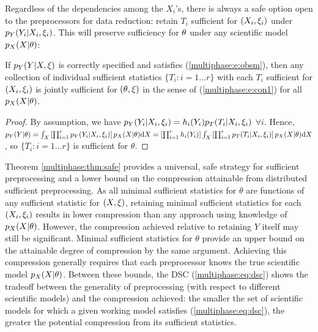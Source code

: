 Regardless of the dependencies among the $X_i$'s, there is always a safe option open to the preprocessors for data reduction: retain $T_i$ sufficient for $(X_i, \xi_i)$ under $p_Y(Y_i | X_i, \xi_i)$.
This will preserve sufficiency for $\theta$ under any scientific model $p_X(X | \theta)$:
%
\begin{theorem}\label{multiphase:thm:safe}
If $p_Y(Y | X, \xi)$ is correctly specified and satisfies (\ref{multiphase:e:obsm}), then any collection of individual sufficient statistics $\{T_i : i=1 \ldots r\}$ with each $T_i$ sufficient for $(X_i, \xi_i)$ is jointly sufficient for $(\theta, \xi)$ in the sense of (\ref{multiphase:e:con1}) for all $p_X(X | \theta)$.
\end{theorem}
\begin{proof}
By assumption, we have $p_Y(Y_i | X_i, \xi_i) = h_i(Y_i) p_T(T_i | X_i, \xi_i)$ $\forall i$. Hence, $p_Y(Y | \theta) = \int_X \left[ \prod_{i=1}^r p_Y(Y_i | X_i, \xi_i) \right] p_X(X | \theta) \mathrm{d} X = \left[ \prod_{i=1}^r h_i(Y_i) \right] \int_X \left[ \prod_{i=1}^r p_T(T_i | X_i, \xi_i) \right] p_X(X | \theta) \mathrm{d} X$, so $\{T_i : i=1 \ldots r\}$ is sufficient for $\theta$.
\end{proof}
%
Theorem \ref{multiphase:thm:safe} provides a universal, safe strategy for sufficient preprocessing and a lower bound on the compression attainable from distributed sufficient preprocessing.
As all minimal sufficient statistics for $\theta$ are functions of any sufficient statistic for $(X, \xi)$, retaining minimal sufficient statistics for each $(X_i, \xi_i)$ results in lower compression than any approach using knowledge of $p_X(X | \theta)$.
However, the compression achieved relative to retaining $Y$ itself may still be significant.
%
Minimal sufficient statistics for $\theta$ provide an upper bound on the attainable degree of compression by the same argument.
Achieving this compression generally requires that each preprocessor knows the true scientific model $p_X(X | \theta)$.
Between these bounds, the DSC (\ref{multiphase:eq:dsc}) shows the tradeoff between the generality of preprocessing (with respect to different scientific models) and the compression achieved: the smaller the set of scientific models for which a given working model satisfies (\ref{multiphase:eq:dsc}), the greater the potential compression from its sufficient statistics.

